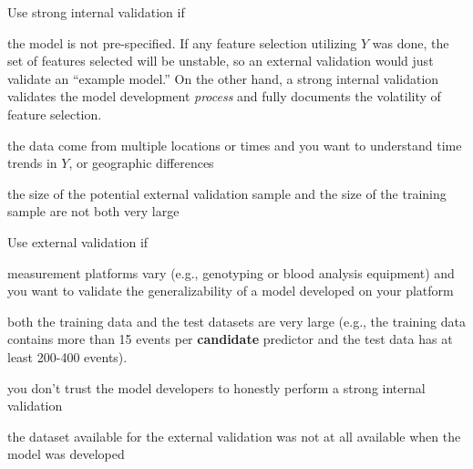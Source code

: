 Use strong internal validation if
\bi
\item the model is not pre-specified.  If any feature selection
  utilizing $Y$ was done, the set of features selected will be
  unstable, so an external validation would just validate an ``example
  model.''  On the other hand, a strong internal validation validates
  the model development \emph{process} and fully documents the
  volatility of feature selection.
\item the data come from multiple locations or times and you want to
  understand time trends in $Y$, or geographic differences
\item the size of the potential external validation sample and the
  size of the training sample are not both very large
\ei

Use external validation if
\bi
\item measurement platforms vary (e.g., genotyping or blood analysis
  equipment) and you want to validate the generalizability of a model
  developed on your platform
\item both the training data and the test datasets are very large
  (e.g., the training data contains more than 15 events per
  \textbf{candidate} predictor and the test data has at least 200-400 events).
\item you don't trust the model developers to honestly perform a
  strong internal validation
\item the dataset available for the external validation was not
  at all available when the model was developed
\ei

\def\apacue{0}
